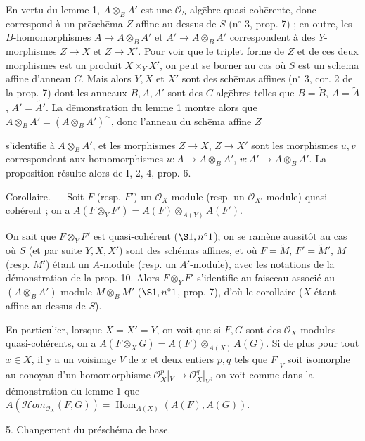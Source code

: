En vertu du lemme 1, $A \otimes_B A'$ est une $\mathcal{O}_S$-alg\=ebre quasi-coh\=erente, donc correspond \`a un pr\=esch\=ema $Z$ affine au-dessus de $S$ (n$^\circ$ 3, prop. 7) ; en outre, les $B$-homomorphismes $A \to A \otimes_B A'$ et $A' \to A \otimes_B A'$ correspondent \`a des $Y$-morphismes $Z \to X$ et $Z \to X'$.  Pour voir que le triplet form\=e de $Z$ et de ces deux morphismes est un produit $X \times_Y X'$, on peut se borner au cas o\`u $S$ est un sch\=ema affine d'anneau $C$. Mais alors $Y, X$ et $X'$ sont des sch\=emas affines (n$^\circ$ 3, cor. 2 de la prop. 7) dont les anneaux $B, A, A'$ sont des $C$-alg\=ebres telles que $B = \tilde{B}$, $A = \tilde{A}$, $A' = \tilde{A'}$. La d\=emonstration du lemme 1 montre alors que $A \otimes_B A' = (A \otimes_B A')^\sim$, donc l'anneau du sch\=ema affine $Z$

\newpage


s'identifie à $A \otimes_B A'$, et les morphismes $Z \to X$, $Z \to X'$ sont les morphismes $u, v$ correspondant aux homomorphismes $u: A \to A \otimes_B A'$, $v: A' \to A \otimes_B A'$. La proposition résulte alors de I, 2, 4, prop. 6.

Corollaire. — Soit $F$ (resp. $F'$) un $\mathcal{O}_X$-module (resp. un $\mathcal{O}_{X'}$-module) quasi-cohérent ; on a $A(F \otimes_Y F') = A(F) \otimes_{A(Y)} A(F')$.

On sait que $F \otimes_Y F'$ est quasi-cohérent ($\S 1, n^\circ 1$); on se ramène aussitôt au cas où $S$ (et par suite $Y, X, X'$) sont des schémas affines, et où $F = \tilde{M}$, $F' = \tilde{M}'$, $M$ (resp. $M'$) étant un $A$-module (resp. un $A'$-module), avec les notations de la démonstration de la prop. 10. Alors $F \otimes_Y F'$ s'identifie au faisceau associé au $(A \otimes_B A')$-module $M \otimes_B M'$ ($\S 1, n^\circ 1$, prop. 7), d'où le corollaire ($X$ étant affine au-dessus de $S$).

En particulier, lorsque $X=X'=Y$, on voit que si $F, G$ sont des $\mathcal{O}_X$-modules quasi-cohérents, on a $A(F \otimes_X G) = A(F) \otimes_{A(X)} A(G)$. Si de plus pour tout $x \in X$, il y a un voisinage $V$ de $x$ et deux entiers $p,q$ tels que $F|_V$ soit isomorphe au conoyau d'un homomorphisme $\mathcal{O}_X^p|_V \to \mathcal{O}_X^q|_V$, on voit comme dans la démonstration du lemme 1 que $A(\mathcal{H}om_{\mathcal{O}_X}(F, G)) = \operatorname{Hom}_{A(X)}(A(F), A(G))$.

5. Changement du préschéma de base.

